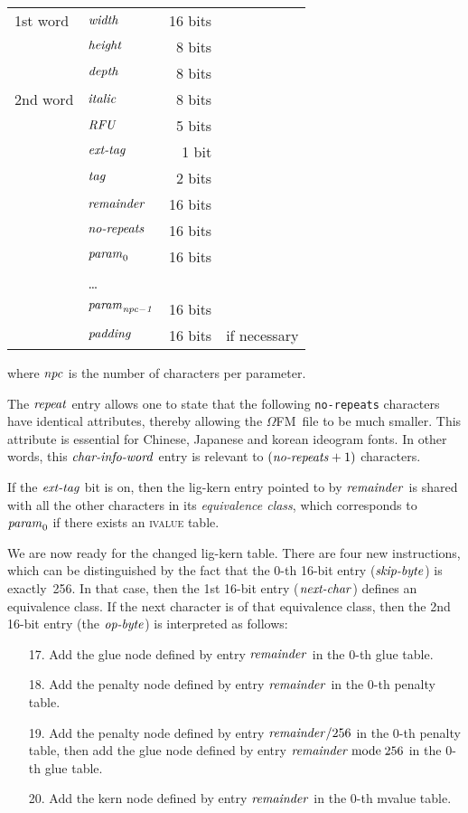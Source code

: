 \documentclass[fleqn]{article}
\newcommand{\OMEGA}{$\Omega$}
\newcommand{\myit}[1]{\mbox{\emph{#1}}}
\newcommand{\OFM}{\OMEGA FM}
\begin{document}
\begin{tabular}{llrl}
1st word & $\myit{width}$ & 16 bits\\
& $\myit{height}$ & 8 bits\\
& $\myit{depth}$ & 8 bits\\
\hline
2nd word & $\myit{italic}$ & 8 bits\\
& $\myit{RFU}$ & 5 bits\\
& $\myit{ext-tag}$ & 1 bit\\
& $\myit{tag}$ & 2 bits\\
& $\myit{remainder}$ & 16 bits\\
\hline
& $\myit{no-repeats}$ & 16 bits\\
& $\myit{param}_0$ & 16 bits\\
& \ldots\\
& $\myit{param}_{\it npc-1}$ & 16 bits\\
& $\myit{padding}$ & 16 bits & if necessary\\
\end{tabular}
\vspace*{.1cm}

\noindent
where $\myit{npc}$ is the number of characters per parameter.

The $\myit{repeat}$ entry allows one to state that the following
\texttt{no-repeats} characters have identical attributes, thereby
allowing the \OFM\ file to be much smaller.  This attribute is essential
for Chinese, Japanese and korean ideogram fonts.  In other words, this
$\myit{char-info-word}$ entry is relevant to $(\myit{no-repeats}+1)$
characters.

If the $\myit{ext-tag}$ bit is on, then the lig-kern entry pointed to
by $\myit{remainder}$ is shared with all the other characters in its
\emph{equivalence class}, which corresponds to $\myit{param}_0$
if there exists an \textsc{ivalue} table.

We are now ready for the changed lig-kern table.  There are four
new instructions, which can be distinguished by the fact that
the 0-th 16-bit entry ($\myit{skip-byte}$) is exactly~256.
In that case, then the 1st 16-bit entry ($\myit{next-char}$)
defines an equivalence class.  If the next character is of that
equivalence class, then the 2nd 16-bit entry
(the $\myit{op-byte}$) is interpreted as follows:
\begin{enumerate}
\item[17.]  Add the glue node defined by entry $\myit{remainder}$
in the 0-th glue table.
\item[18.]  Add the penalty node defined by entry $\myit{remainder}$
in the 0-th penalty table.
\item[19.]  Add the penalty node defined by entry
$\myit{remainder}/256$ in the 0-th penalty table, then
add the glue node defined by entry
$\myit{remainder}\;\textrm{mode}\;256$ in the 0-th glue table.
\item[20.]  Add the kern node defined by entry $\myit{remainder}$
in the 0-th mvalue table.
\end{enumerate}
\end{document}
